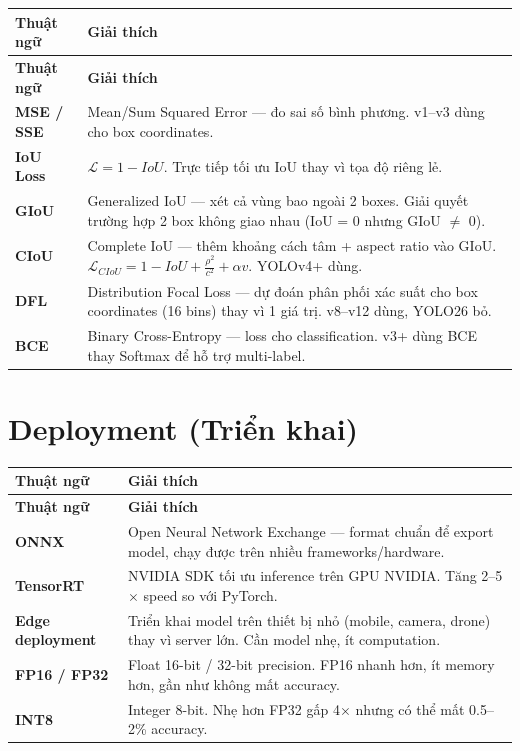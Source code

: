 \documentclass[12pt,a4paper]{report}
\begin{document}
\begin{longtable}{p{3.5cm}p{12cm}}
\toprule
\textbf{Thuật ngữ} & \textbf{Giải thích} \\
\midrule
\endfirsthead
\toprule
\textbf{Thuật ngữ} & \textbf{Giải thích} \\
\midrule
\endhead

\textbf{MSE / SSE} & Mean/Sum Squared Error --- đo sai số bình phương. v1--v3 dùng cho box coordinates. \\
\midrule
\textbf{IoU Loss} & $\mathcal{L} = 1 - IoU$. Trực tiếp tối ưu IoU thay vì tọa độ riêng lẻ. \\
\midrule
\textbf{GIoU} & Generalized IoU --- xét cả vùng bao ngoài 2 boxes. Giải quyết trường hợp 2 box không giao nhau (IoU = 0 nhưng GIoU $\neq$ 0). \\
\midrule
\textbf{CIoU} & Complete IoU --- thêm khoảng cách tâm + aspect ratio vào GIoU. $\mathcal{L}_{CIoU} = 1 - IoU + \frac{\rho^2}{c^2} + \alpha v$. YOLOv4+ dùng. \\
\midrule
\textbf{DFL} & Distribution Focal Loss --- dự đoán phân phối xác suất cho box coordinates (16 bins) thay vì 1 giá trị. v8--v12 dùng, YOLO26 bỏ. \\
\midrule
\textbf{BCE} & Binary Cross-Entropy --- loss cho classification. v3+ dùng BCE thay Softmax để hỗ trợ multi-label. \\
\bottomrule
\end{longtable}

\section*{Deployment (Triển khai)}

\begin{longtable}{p{3.5cm}p{12cm}}
\toprule
\textbf{Thuật ngữ} & \textbf{Giải thích} \\
\midrule
\endfirsthead
\toprule
\textbf{Thuật ngữ} & \textbf{Giải thích} \\
\midrule
\endhead

\textbf{ONNX} & Open Neural Network Exchange --- format chuẩn để export model, chạy được trên nhiều frameworks/hardware. \\
\midrule
\textbf{TensorRT} & NVIDIA SDK tối ưu inference trên GPU NVIDIA. Tăng 2--5$\times$ speed so với PyTorch. \\
\midrule
\textbf{Edge deployment} & Triển khai model trên thiết bị nhỏ (mobile, camera, drone) thay vì server lớn. Cần model nhẹ, ít computation. \\
\midrule
\textbf{FP16 / FP32} & Float 16-bit / 32-bit precision. FP16 nhanh hơn, ít memory hơn, gần như không mất accuracy. \\
\midrule
\textbf{INT8} & Integer 8-bit. Nhẹ hơn FP32 gấp 4$\times$ nhưng có thể mất 0.5--2\% accuracy. \\
\bottomrule
\end{longtable}

\end{document}
